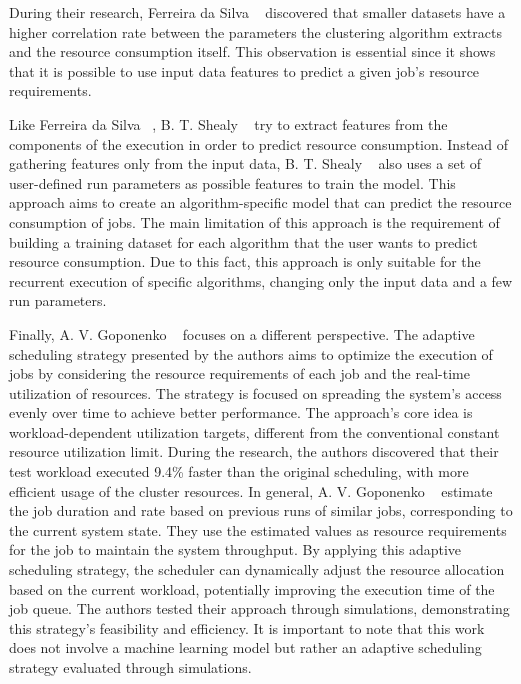 During their research, Ferreira da Silva \etal~\cite{ferreira2013} discovered that smaller datasets have a higher correlation rate between the parameters the clustering algorithm extracts and the resource consumption itself.
This observation is essential since it shows that it is possible to use input data features to predict a given job's resource requirements.

Like Ferreira da Silva \etal~\cite{ferreira2013}, B. T. Shealy \etal~\cite{shealy2021} try to extract features from the components of the execution in order to predict resource consumption.
Instead of gathering features only from the input data, B. T. Shealy \etal~\cite{shealy2021} also uses a set of user-defined run parameters as possible features to train the model.
This approach aims to create an algorithm-specific model that can predict the resource consumption of jobs.
The main limitation of this approach is the requirement of building a training dataset for each algorithm that the user wants to predict resource consumption.
Due to this fact, this approach is only suitable for the recurrent execution of specific algorithms, changing only the input data and a few run parameters.

Finally, A. V. Goponenko \etal~\cite{goponenko2020} focuses on a different perspective.
The adaptive scheduling strategy presented by the authors aims to optimize the execution of jobs by considering the resource requirements of each job and the real-time utilization of resources.
The strategy is focused on spreading the system's access evenly over time to achieve better performance.
The approach's core idea is workload-dependent utilization targets, different from the conventional constant resource utilization limit.
During the research, the authors discovered that their test workload executed 9.4\% faster than the original scheduling, with more efficient usage of the cluster resources.
In general, A. V. Goponenko \etal~\cite{goponenko2020} estimate the job duration and rate based on previous runs of similar jobs, corresponding to the current system state.
They use the estimated values as resource requirements for the job to maintain the system throughput.
By applying this adaptive scheduling strategy, the scheduler can dynamically adjust the resource allocation based on the current workload, potentially improving the execution time of the job queue.
The authors tested their approach through simulations, demonstrating this strategy's feasibility and efficiency.
It is important to note that this work does not involve a machine learning model but rather an adaptive scheduling strategy evaluated through simulations.

